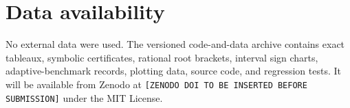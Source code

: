 \section*{Data availability}
No external data were used. The versioned code-and-data archive contains exact tableaux, symbolic certificates, rational root brackets, interval sign charts, adaptive-benchmark records, plotting data, source code, and regression tests. It will be available from Zenodo at \texttt{[ZENODO DOI TO BE INSERTED BEFORE SUBMISSION]} under the MIT License.



